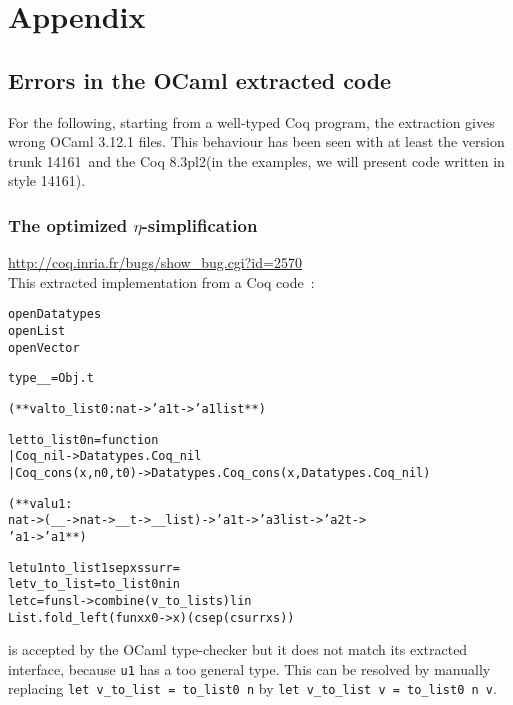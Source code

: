 \documentclass[a4paper, 11pt]{article}
\newenvironment{ml}
  {%
   \begin{alltt}
   \footnotesize} %% 3.12.1
  {\end{alltt} %
  }
\newcommand{\ocaml}{OCaml 3.12.1\xspace}
\newcommand{\coqc}{Coq 8.3pl2\xspace}
\newcommand{\coqv}{14161}
\begin{document}



\newpage
\appendix
\section{Appendix}
\subsection{Errors in the OCaml extracted code}
For the following, starting from a well-typed Coq program, the extraction gives wrong \ocaml files. This behaviour has been seen with at least the version trunk \coqv~and the \coqc (in the examples, we will present code written in style \coqv).
\subsubsection{The optimized $\eta$-simplification}
\label{s:appendix_eta}
\url{http://coq.inria.fr/bugs/show_bug.cgi?id=2570}\\
This extracted implementation from a Coq code~:
\begin{ml}
open Datatypes
open List
open Vector

type __ = Obj.t

(** val to_list0 : nat -> 'a1 t -> 'a1 list **)

let to_list0 n = function
| Coq_nil -> Datatypes.Coq_nil
| Coq_cons (x, n0, t0) -> Datatypes.Coq_cons (x, Datatypes.Coq_nil)

(** val u1 :
    nat -> (__ -> nat -> __ t -> __ list) -> 'a1 t -> 'a3 list -> 'a2 t ->
    'a1 -> 'a1 **)

let u1 n to_list1 sep xs surr =
  let v_to_list = to_list0 n in
  let c = fun s l -> combine (v_to_list s) l in
  List.fold_left (fun x x0 -> x) (c sep (c surr xs))
\end{ml}
is accepted by the OCaml type-checker but it does not match its extracted interface, because \verb|u1| has a too general type. This can be resolved by manually replacing \verb|let v_to_list = to_list0 n| by \verb|let v_to_list v = to_list0 n v|.
\end{document}
